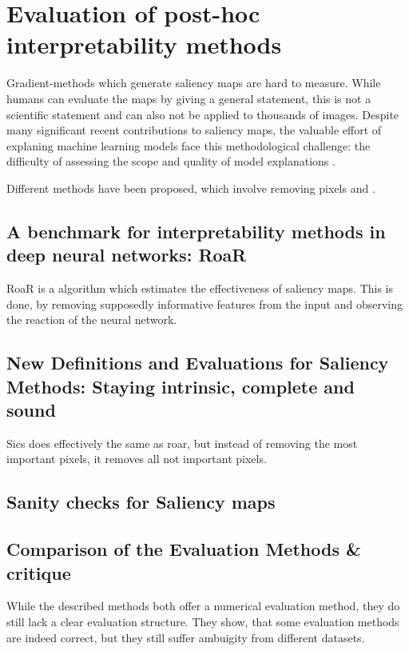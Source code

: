 \section{Evaluation of post-hoc interpretability methods}

Gradient-methods which generate saliency maps are hard to measure. While humans can evaluate the maps by giving a general statement, this is not a scientific statement and can also not be applied to thousands of images. Despite many significant recent contributions to saliency maps, the valuable effort of explaning machine learning models face this methodological challenge: the difficulty of assessing the scope and quality of model explanations \cite{adebayo2020sanity}.


Different methods have been proposed, which involve removing pixels \cite{hooker2019benchmark} and \cite{gupta2022new}.




\subsection{A benchmark for interpretability methods in deep neural networks: RoaR}

RoaR is a algorithm which estimates the effectiveness of saliency maps. This is done, by removing supposedly informative features from the input and observing the reaction of the neural network.


\subsection{New Definitions and Evaluations for Saliency Methods: Staying intrinsic, complete and sound}

Sics does effectively the same as roar, but instead of removing the most important pixels, it removes all not important pixels.


\subsection{Sanity checks for Saliency maps}



\subsection{Comparison of the Evaluation Methods \& critique}

While the described methods both offer a numerical evaluation method, they do still lack a clear evaluation structure. They show, that some evaluation methods are indeed correct, but they still suffer ambuigity from different datasets.




